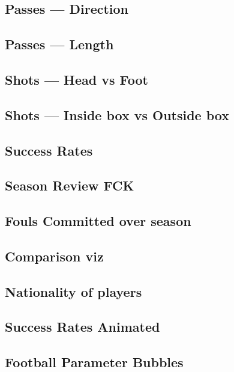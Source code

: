 \documentclass[a4paper,11pt]{article}
\begin{document}
\subsection{Passes --- Direction}


\subsection{Passes --- Length}


\subsection{Shots --- Head vs Foot}


\subsection{Shots --- Inside box vs Outside box}


\subsection{Success Rates}


\subsection{Season Review FCK}


\subsection{Fouls Committed over season}


\subsection{Comparison viz}


\subsection{Nationality of players}


\subsection{Success Rates Animated}


\subsection{Football Parameter Bubbles}

\end{document}
